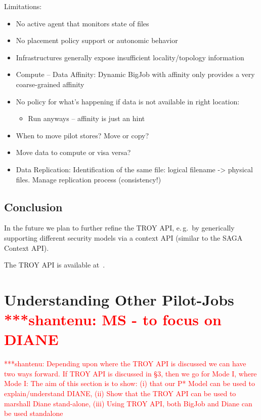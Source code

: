 \documentclass[conference,final]{IEEEtran}
\newcommand{\jhanote}[1]{ {\textcolor{red} { ***shantenu: #1 }}}
\newcommand{\jhanote}[1]{}
\begin{document}
Limitations:
\begin{itemize}
    \item No active agent that monitors state of files
    \item No placement policy support or autonomic behavior
    \item Infrastructures generally expose insufficient locality/topology information
    \item Compute – Data Affinity: Dynamic BigJob with affinity only provides a very coarse-grained affinity
    \item No policy for what’s happening if data is not available in right location:
    \begin{itemize}
        \item Run anyways – affinity is just an hint
    \end{itemize}
    \item When to move pilot stores? Move or copy?
    \item Move data to compute or visa versa?
    \item Data Replication: Identification of the same file: logical filename -> physical files. Manage replication process (consistency!)
\end{itemize}

\subsection{Conclusion}

In the future we plan to further refine the TROY API, e.\,g.\ by generically supporting different security models via a context API (similar to the SAGA Context API).

The TROY API is available at~\cite{troy_api}.


\section{Understanding Other Pilot-Jobs \jhanote{MS - to focus on
    DIANE}}


\jhanote{Depending upon where the TROY API is discussed we can have
  two ways forward. If TROY API is discussed in \S 3, then we go for
  Mode I, where Mode I: The aim of this section is to show: (i) that
  our P* Model can be used to explain/understand DIANE, (ii) Show that
  the TROY API can be used to marshall Diane stand-alone, (iii) Using
  TROY API, both BigJob and Diane can be used standalone}
\end{document}
